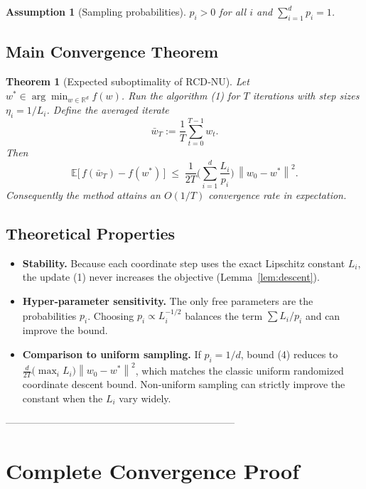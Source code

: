 \documentclass{article}
\newtheorem{theorem}{Theorem}
\newtheorem{assumption}{Assumption}
\newcommand{\E}{\mathbb{E}}
\newcommand{\R}{\mathbb{R}}
\newcommand{\norm}[1]{\left\|#1\right\|}
\begin{document}
\begin{assumption}[Sampling probabilities]\label{as:prob}
$p_i>0$ for all $i$ and $\sum_{i=1}^{d}p_i=1$.
\end{assumption}

\subsection*{Main Convergence Theorem}
\begin{theorem}[Expected suboptimality of RCD‑NU]\label{thm:main}
Let $w^{*}\in\arg\min_{w\in\R^{d}}f(w)$.  Run the algorithm (1) for $T$ iterations with step sizes $\eta_i=1/L_i$.  Define the averaged iterate
\[
\bar w_T:=\frac{1}{T}\sum_{t=0}^{T-1}w_t .
\]
Then
\[
\E\!\big[\,f(\bar w_T)-f(w^{*})\,\big]\;\le\;
\frac{1}{2T}\Big(\sum_{i=1}^{d}\frac{L_i}{p_i}\Big)\,
\norm{w_{0}-w^{*}}^{2}.
\tag{4}
\]
Consequently the method attains an $O(1/T)$ convergence rate in expectation.
\end{theorem}

\subsection*{Theoretical Properties}
\begin{itemize}
\item \textbf{Stability.}  Because each coordinate step uses the exact Lipschitz constant $L_i$, the update (1) never increases the objective (Lemma~\ref{lem:descent}).
\item \textbf{Hyper‑parameter sensitivity.}  The only free parameters are the probabilities $p_i$.  Choosing $p_i\propto L_i^{-1/2}$ balances the term $\sum L_i/p_i$ and can improve the bound.
\item \textbf{Comparison to uniform sampling.}  If $p_i=1/d$, bound (4) reduces to $\frac{d}{2T}\big(\max_i L_i\big)\norm{w_0-w^{*}}^{2}$, which matches the classic uniform randomized coordinate descent bound.  Non‑uniform sampling can strictly improve the constant when the $L_i$ vary widely.
\end{itemize}

---------------------------------------------------------------------

\section*{Complete Convergence Proof}
\end{document}
